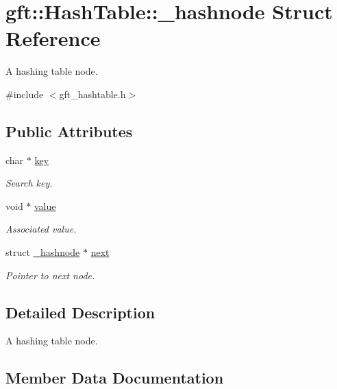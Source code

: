 \hypertarget{structgft_1_1HashTable_1_1__hashnode}{}\section{gft\+:\+:Hash\+Table\+:\+:\+\_\+hashnode Struct Reference}
\label{structgft_1_1HashTable_1_1__hashnode}


A hashing table node.  




{\ttfamily \#include $<$gft\+\_\+hashtable.\+h$>$}

\subsection*{Public Attributes}
\begin{DoxyCompactItemize}
\item 
char $\ast$ \hyperlink{structgft_1_1HashTable_1_1__hashnode_a6eb232e6a3259f802947f1968288e319}{key}
\begin{DoxyCompactList}\small\item\em Search key. \end{DoxyCompactList}\item 
void $\ast$ \hyperlink{structgft_1_1HashTable_1_1__hashnode_a2e02f3fdfd0d509ca0ec8dbdd57e19de}{value}
\begin{DoxyCompactList}\small\item\em Associated value. \end{DoxyCompactList}\item 
struct \hyperlink{structgft_1_1HashTable_1_1__hashnode}{\+\_\+hashnode} $\ast$ \hyperlink{structgft_1_1HashTable_1_1__hashnode_ab30373c898ea03781984ea757fa439f5}{next}
\begin{DoxyCompactList}\small\item\em Pointer to next node. \end{DoxyCompactList}\end{DoxyCompactItemize}


\subsection{Detailed Description}
A hashing table node. 

\subsection{Member Data Documentation}
